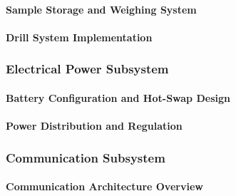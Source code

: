 \paragraph{Sample Storage and Weighing System}
\label{par:sample_storage_weighing_system}


\paragraph{Drill System Implementation}
\label{par:drill_system_implementation}


\subsubsection{Electrical Power Subsystem}
\label{subsubsec:electrical_power_subsystem}

\paragraph{Battery Configuration and Hot-Swap Design}
\label{par:battery_configuration_hotswap_design}


\paragraph{Power Distribution and Regulation}
\label{par:power_distribution_regulation}


\subsubsection{Communication Subsystem}
\label{subsubsec:communication_subsystem}

\paragraph{Communication Architecture Overview}
\label{par:communication_architecture_overview}


